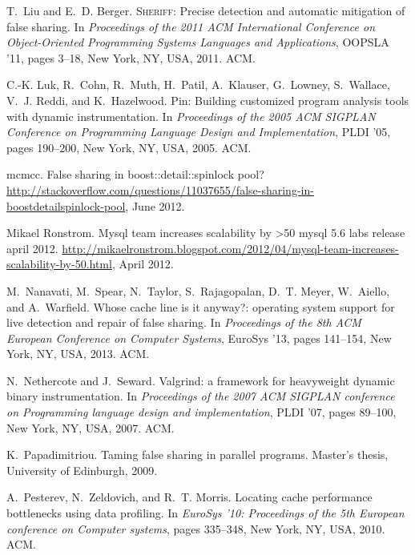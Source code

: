 \documentclass[10pt]{sigplanconf}
\begin{document}
\begin{thebibliography}{10}
T.~Liu and E.~D. Berger.
\newblock \textsc{Sheriff}: Precise detection and automatic mitigation of false
  sharing.
\newblock In {\em {Proceedings of the 2011 ACM International Conference on
  Object-Oriented Programming Systems Languages and Applications}}, OOPSLA '11,
  pages 3--18, New York, NY, USA, 2011. ACM.

C.-K. Luk, R.~Cohn, R.~Muth, H.~Patil, A.~Klauser, G.~Lowney, S.~Wallace, V.~J.
  Reddi, and K.~Hazelwood.
\newblock Pin: Building customized program analysis tools with dynamic
  instrumentation.
\newblock In {\em Proceedings of the 2005 ACM SIGPLAN Conference on Programming
  Language Design and Implementation}, PLDI '05, pages 190--200, New York, NY,
  USA, 2005. ACM.

{mcmcc}.
\newblock False sharing in boost::detail::spinlock pool?
\newblock
  \url{http://stackoverflow.com/questions/11037655/false-sharing-in-boostdetailspinlock-pool},
  June 2012.

{Mikael Ronstrom}.
\newblock Mysql team increases scalability by >50%
  mysql 5.6 labs release april 2012.
\newblock
  \url{http://mikaelronstrom.blogspot.com/2012/04/mysql-team-increases-scalability-by-50.html},
  April 2012.

M.~Nanavati, M.~Spear, N.~Taylor, S.~Rajagopalan, D.~T. Meyer, W.~Aiello, and
  A.~Warfield.
\newblock Whose cache line is it anyway?: operating system support for live
  detection and repair of false sharing.
\newblock In {\em Proceedings of the 8th ACM European Conference on Computer
  Systems}, EuroSys '13, pages 141--154, New York, NY, USA, 2013. ACM.

N.~Nethercote and J.~Seward.
\newblock Valgrind: a framework for heavyweight dynamic binary instrumentation.
\newblock In {\em Proceedings of the 2007 ACM SIGPLAN conference on Programming
  language design and implementation}, PLDI '07, pages 89--100, New York, NY,
  USA, 2007. ACM.

K.~Papadimitriou.
\newblock Taming false sharing in parallel programs.
\newblock Master's thesis, University of Edinburgh, 2009.

A.~Pesterev, N.~Zeldovich, and R.~T. Morris.
\newblock Locating cache performance bottlenecks using data profiling.
\newblock In {\em EuroSys '10: Proceedings of the 5th European conference on
  Computer systems}, pages 335--348, New York, NY, USA, 2010. ACM.


\end{thebibliography}
\end{document}
